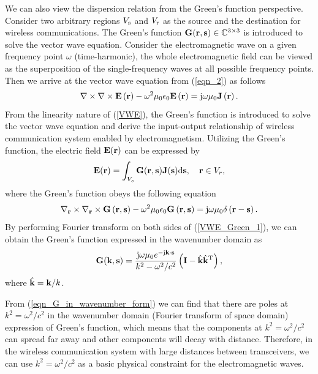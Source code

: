 \documentclass[12pt,draftclsnofoot,journal,onecolumn]{IEEEtran}
\begin{document}
{We can also view the dispersion relation from the Green's function perspective. Consider two arbitrary regions $V_{\rm s}$ and $V_{\rm r}$ as the source and the destination for wireless communications. The Green's function ${\bf{G}} ({\bf{r}},{\bf{s}})\in \mathbb{C}^{3\times 3}$ is introduced to solve the vector wave equation. Consider the electromagnetic wave on a given frequency point $\omega$ (time-harmonic)\cite{gruber2008new}, the whole electromagnetic field can be viewed as the superposition of the single-frequency waves at all possible frequency points. Then we arrive at the vector wave equation from (\ref{eqn_2}) as follows
\begin{equation}
\nabla  \times \nabla  \times {\bf{E}}\left( {\bf{r}} \right) - {\omega ^2 \mu_0 \epsilon_0}{\bf{E}}\left( {\bf{r}} \right) = {\rm j}\omega {\mu _0}{\bf{J}}\left( {\bf{r}} \right).
\label{VWE}
\end{equation}
From the linearity nature of (\ref{VWE}), the Green's function is introduced to solve the vector wave equation and derive the input-output relationship of wireless communication system enabled by electromagnetism. 
Utilizing the Green's function, the electric field ${\bf{E}}({\bf{r}})$ can be expressed by  
\begin{equation}
	{\bf{E}}({\bf{r}}) = \int_{{V_s}} {\bf{G}} ({\bf{r}},{\bf{s}}){\bf{J}}({\bf{s}}){\rm d}{\bf{s}},\quad {\bf{r}} \in {V_r},
	\label{VWE_Green}
\end{equation}
where the Green's function obeys the following equation
\begin{equation}
	\nabla_{\bf r}  \times \nabla_{\bf r}  \times {\bf{G}}\left( {\bf{r}},{\bf {s}} \right) - {\omega ^2 \mu_0 \epsilon_0}{\bf{G}}\left( {\bf{r}},{\bf {s}} \right) = {\rm j}\omega {\mu _0}\delta\left( {\bf{r}}-{\bf {s}} \right).
	\label{VWE_Green_1}
\end{equation}
By performing Fourier transform on both sides of (\ref{VWE_Green_1})\cite{poon2005degrees}, we can obtain the Green's function expressed in the wavenumber domain as 
\begin{equation}
	{\bf G}({\bf k},{\bf s}) = \frac{{\rm j}\omega\mu_0 e^{-{\rm j}{\bf k}\cdot {\bf s}}}{k^2-\omega^2/c^2}\left({\bf I} - \hat{\bf k}\hat{\bf k}^{\rm T}  \right),
	\label{eqn_G_in_wavenumber_form}
\end{equation}
where $\hat{\bf k} = {\bf k}/k$.

From (\ref{eqn_G_in_wavenumber_form}) we can find that there are poles at $k^2 = \omega^2/c^2$ in the wavenumber domain (Fourier transform of space domain) expression of Green's function, which means that the components at $k^2 = \omega^2/c^2$ can spread far away and other components will decay with distance. Therefore, in the wireless communication system with large distances between transceivers, we can use $k^2 = \omega^2/c^2$ as a basic physical constraint for the electromagnetic waves. 



}
\end{document}
